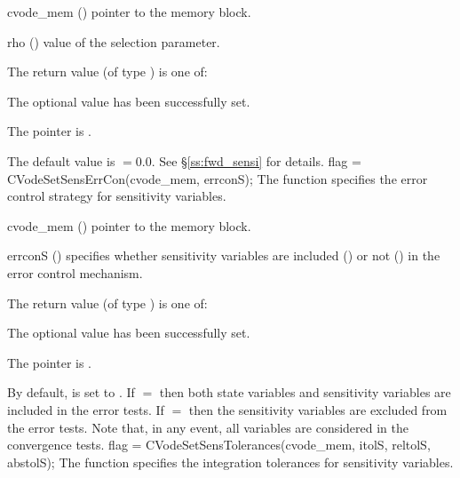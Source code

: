 {
  \begin{args}
  \item[cvode\_mem] ()
    pointer to the {\cvodes} memory block.
  \item[rho] ()
    value of the selection parameter.
  \end{args}
}
{
  The return value  (of type ) is one of:
  \begin{args}
  \item[\Id{CV\_SUCCESS}]
    The optional value has been successfully set.
  \item[\Id{CV\_MEM\_NULL}]
    The  pointer is .
  \end{args}
}
{
  The default value is $=0.0$. See \S\ref{ss:fwd_sensi} for
  details.
}
{
  flag = CVodeSetSensErrCon(cvode\_mem, errconS);
}
{
  The function  specifies the error control
  strategy for sensitivity variables.
}
{
  \begin{args}
  \item[cvode\_mem] ()
    pointer to the {\cvodes} memory block.
  \item[errconS] ()
    specifies whether sensitivity variables are included () or not
    () in the error control mechanism.
  \end{args}
}
{
  The return value  (of type ) is one of:
  \begin{args}
  \item[\Id{CV\_SUCCESS}] 
    The optional value has been successfully set.
  \item[\Id{CV\_MEM\_NULL}]
    The  pointer is .
  \end{args}
}
{
  By default,  is set to . 
  If $=$ then both state variables and
  sensitivity variables are included in the error tests. 
  If $=$ then the sensitivity variables are excluded from the 
  error tests. Note that, in any event, all variables are considered in the convergence 
  tests.
}
{
  flag = CVodeSetSensTolerances(cvode\_mem, itolS, reltolS, abstolS);
}
{
  The function  specifies the integration tolerances for
  sensitivity variables.
}
